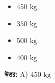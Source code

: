 \documentclass[12pt, a4paper]{article}
\begin{document}
\begin{itemize}[label={}, leftmargin=1cm, itemsep=0.5em]
    \item[\textbf{A)}]  $450\text{ kg}$ 
    \item[\textbf{B)}]  $350\text{ kg}$ 
    \item[\textbf{C)}]  $500\text{ kg}$ 
    \item[\textbf{D)}]  $400\text{ kg}$ 
\end{itemize}

\vspace{0.5em}
\begin{tcolorbox}[answerbox]
    \textbf{\color{success} উত্তর:} A)  $450\text{ kg}$ 
\end{tcolorbox}
\vspace{1em}
\end{document}
